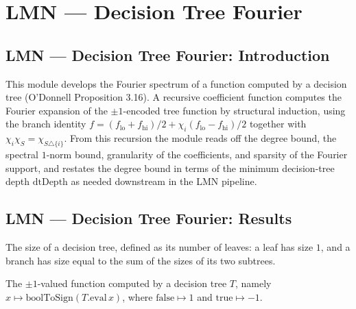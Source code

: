 \section{LMN --- Decision Tree Fourier}
\subsection*{LMN --- Decision Tree Fourier: Introduction}

This module develops the Fourier spectrum of a function computed by a decision tree
(O'Donnell Proposition 3.16). A recursive coefficient function computes the Fourier
expansion of the $\pm 1$-encoded tree function by structural induction, using the branch
identity $f = (f_{\mathrm{lo}} + f_{\mathrm{hi}})/2 + \chi_i (f_{\mathrm{lo}} -
f_{\mathrm{hi}})/2$ together with $\chi_i \chi_S = \chi_{S \triangle \{i\}}$. From this
recursion the module reads off the degree bound, the spectral $1$-norm bound, granularity
of the coefficients, and sparsity of the Fourier support, and restates the degree bound in
terms of the minimum decision-tree depth $\mathrm{dtDepth}$ as needed downstream in the
LMN pipeline.

\subsection*{LMN --- Decision Tree Fourier: Results}

\begin{definition}
\label{DecisionTree.size}
\leanok
{}
The size of a decision tree, defined as its number of leaves: a leaf has size $1$, and a
branch has size equal to the sum of the sizes of its two subtrees.
\end{definition}

\begin{definition}
\label{DecisionTree.signEval}
\leanok
{}
The $\pm 1$-valued function computed by a decision tree $T$, namely
$x \mapsto \mathrm{boolToSign}(T.\mathrm{eval}\,x)$, where $\mathrm{false} \mapsto 1$ and
$\mathrm{true} \mapsto -1$.
\end{definition}

